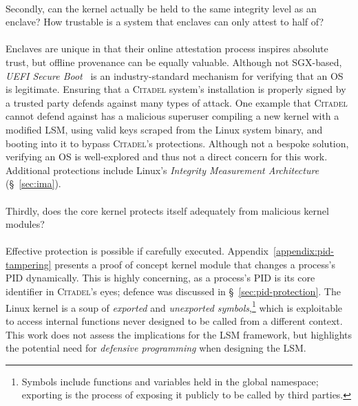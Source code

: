 \paragraph{} Secondly, can the kernel actually be held to the same integrity level as an enclave? How trustable is a system that enclaves can only attest to half of?

\paragraph{} Enclaves are unique in that their online attestation process inspires absolute trust, but offline provenance can be equally valuable. Although not SGX-based, \textit{UEFI Secure Boot}~\cite{Richardson2013UefiSB} is an industry-standard mechanism for verifying that an OS is legitimate. Ensuring that a \textsc{Citadel} system's installation is properly signed by a trusted party defends against many types of attack. One example that \textsc{Citadel} cannot defend against has a malicious superuser compiling a new kernel with a modified LSM, using valid keys scraped from the Linux system binary, and booting into it to bypass \textsc{Citadel}'s protections. Although not a bespoke solution, verifying an OS is well-explored and thus not a direct concern for this work. Additional protections include Linux's \textit{Integrity Measurement Architecture} (§~\ref{sec:ima}).

\paragraph{} Thirdly, does the core kernel protects itself adequately from malicious kernel modules?

\paragraph{} Effective protection is possible if carefully executed. Appendix~\ref{appendix:pid-tampering} presents a proof of concept kernel module that changes a process's PID dynamically. This is highly concerning, as a process's PID is its core identifier in \textsc{Citadel}'s eyes; defence was discussed in §~\ref{sec:pid-protection}. The Linux kernel is a soup of \textit{exported} and \textit{unexported symbols},\footnote{Symbols include functions and variables held in the global namespace; exporting is the process of exposing it publicly to be called by third parties.} which is exploitable to access internal functions never designed to be called from a different context. This work does not assess the implications for the LSM framework, but highlights the potential need for \textit{defensive programming} when designing the LSM.

